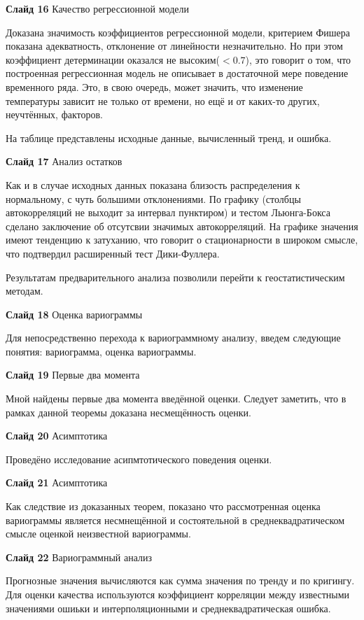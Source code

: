 \documentclass[a4paper,10pt]{report}
\begin{document}
\textbf{Слайд 16} Качество регрессионной модели

Доказана значимость коэффициентов регрессионной модели, критерием Фишера показана адекватность, отклонение от линейности незначительно. Но при этом коэффициент детерминации оказался не высоким($<0.7$), это говорит о том, что построенная регрессионная модель не описывает в достаточной мере поведение временного ряда. Это, в свою очередь, может значить, что изменение температуры зависит не только от времени, но ещё и от каких-то других, неучтённых, факторов.

На таблице представлены исходные данные, вычисленный тренд, и ошибка.

\textbf{Слайд 17} Анализ остатков

Как и в случае исходных данных показана близость распределения к нормальному, с чуть большими отклонениями. По графику (столбцы автокорреляций не выходит за интервал пунктиром) и тестом Льюнга-Бокса сделано заключение об отсутсвии значимых автокорреляций. На графике значения имеют тенденцию к затуханию, что говорит о стационарности в широком смысле, что подтвердил расширенный тест Дики-Фуллера.

Результатам предварительного анализа позволили перейти к геостатистическим методам.

\textbf{Слайд 18} Оценка вариограммы

Для непосредственно перехода к вариограммному анализу, введем следующие понятия: вариограмма, оценка вариограммы.

\textbf{Слайд 19} Первые два момента

Мной найдены первые два момента введённой оценки. Следует заметить, что в рамках данной теоремы доказана несмещённость оценки.

\textbf{Слайд 20} Асимптотика

Проведёно исследование асипмтотического поведения оценки.

\textbf{Слайд 21} Асимптотика

Как следствие из доказанных теорем, показано что рассмотренная оценка вариограммы является несмнещённой и состоятельной в среднеквадратическом смысле оценкой неизвестной вариограммы.

\textbf{Слайд 22} Вариограммный анализ

Прогнозные значения вычисляются как сумма значения по тренду и по кригингу. Для оценки качества используются коэффициент корреляции между известными значениями ошиьки и интерполяционными и среднеквадратическая ошибка.
\end{document}
